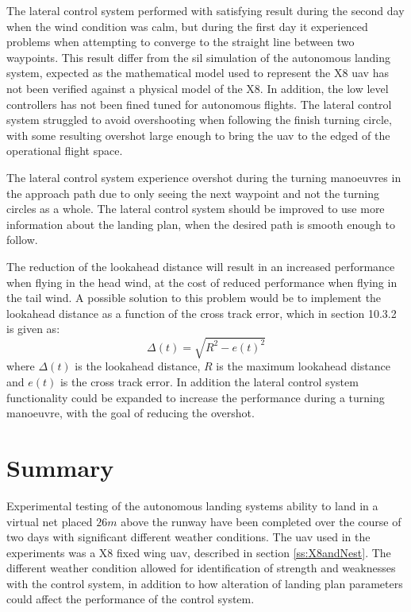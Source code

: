 The lateral control system performed with satisfying result during the second day when the wind condition was calm, but during the first day it experienced problems when attempting to converge to the straight line between two waypoints. This result differ from the \gls{sil} simulation of the autonomous landing system, expected as the mathematical model used to represent the X8 \gls{uav} has not been verified against a physical model of the X8. In addition, the low level controllers has not been fined tuned for autonomous flights. The lateral control system  struggled to avoid overshooting when following the finish turning circle, with some resulting overshot large enough to bring the \gls{uav} to the edged of the operational flight space.

The lateral control system experience overshot during the turning manoeuvres in the approach path due to only seeing the next waypoint and not the turning circles as a whole. The lateral control system should be improved to use more information about the landing plan, when the desired path is smooth enough to follow.

The reduction of the lookahead distance will result in an increased performance when flying in the head wind, at the cost of reduced performance when flying in the tail wind. A possible solution to this problem would be to implement the lookahead distance as a function of the cross track error, which in \citep{fossen2011handbook} section 10.3.2 is given as:
\begin{equation}
\Delta(t) = \sqrt{R^2 - e(t)^2}
\end{equation}
where $\Delta(t)$ is the lookahead distance, $R$ is the maximum lookahead distance and $e(t)$ is the cross track error. In addition the lateral control system functionality could be expanded to increase the performance during a turning manoeuvre, with the goal of reducing the overshot.
\section{Summary}
Experimental testing of the autonomous landing systems ability to land in a virtual net placed $26 m $ above the runway have been completed over the course of two days with significant different weather conditions. The \gls{uav} used in the experiments was a X8 fixed wing \gls{uav}, described in section \ref{ss:X8andNest}. The different weather condition allowed for identification of strength and weaknesses with the control system, in addition to how alteration of landing plan parameters could affect the performance of the control system.

